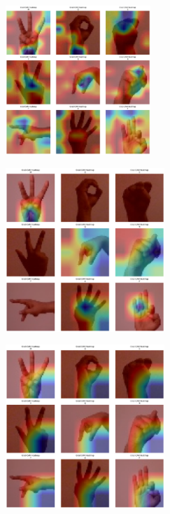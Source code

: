 \begin{multicols}{2}
\vspace{0.5cm}

\includegraphics[width=0.41\textwidth]{Assets/gradcam_heatmap/DenseNet169.png}

\vspace{0.5cm}

\newpage

\includegraphics[width=0.45\textwidth]{Assets/gradcam_heatmap/DENSENET201.png}

\vspace{0.8cm}

\includegraphics[width=0.45\textwidth]{Assets/gradcam_heatmap/EfficientNetB0.png}

\vspace{0.8cm}



\end{multicols}
